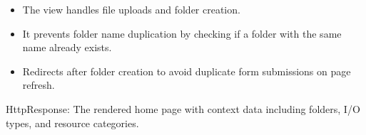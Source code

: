 \documentclass[letterpaper,10pt,english]{sphinxmanual}
\begin{document}
\begin{fulllineitems}
\begin{description}
\begin{itemize}
\begin{description}
\end{description}

\end{itemize}

\begin{itemize}
\item {} 
\sphinxAtStartPar
The view handles file uploads and folder creation.

\item {} 
\sphinxAtStartPar
It prevents folder name duplication by checking if a folder with the same name already exists.

\item {} 
\sphinxAtStartPar
Redirects after folder creation to avoid duplicate form submissions on page refresh.

\end{itemize}

\sphinxAtStartPar
HttpResponse: The rendered home page with context data including folders, I/O types, and resource categories.

\end{description}

\end{fulllineitems}

\end{document}

